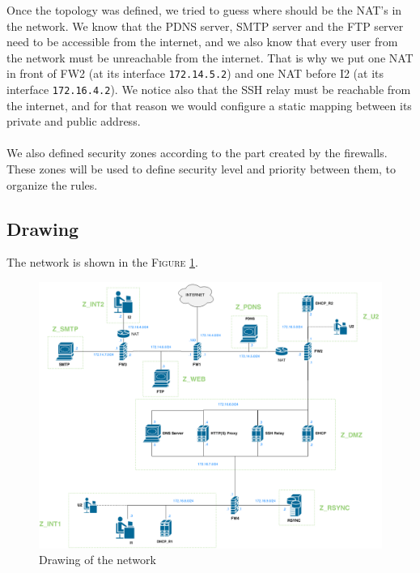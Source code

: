 \documentclass[a4paper,titlepage]{article}
\begin{document}
Once the topology was defined, we tried to guess where should be the NAT's in the network. We know that the  PDNS server, SMTP server and the FTP server need to be accessible from the internet, and we also know that every user from the network must be unreachable from the internet. That is why we put one NAT in front of FW2 (at its interface \texttt{172.14.5.2}) and one NAT before I2 (at its interface \texttt{172.16.4.2}). We notice also that the SSH relay must be reachable from the internet, and for that reason we would configure a static mapping between its private and public address.
\paragraph{}

We also defined security zones according to the part created by the firewalls. These zones will be used to define security level and priority between them, to organize the rules.

\subsection{Drawing}

The network is shown in the \textsc{Figure} \ref{draw}.

\begin{landscape}
	\begin{figure}
		\centering
		\includegraphics[scale=0.47]{ICS-Draw.png}
		\caption{Drawing of the network}
		\label{draw}
	\end{figure}

\end{landscape}
	
\end{document}

